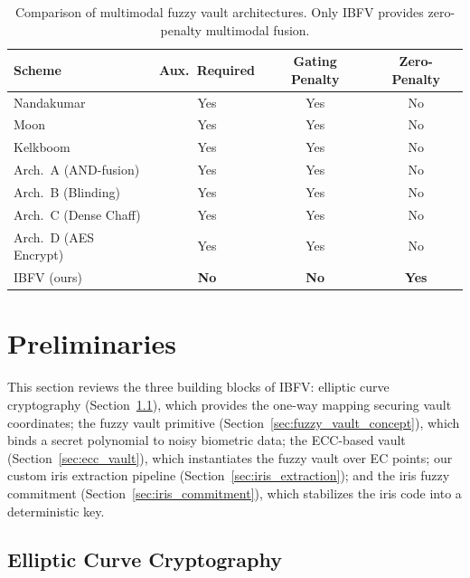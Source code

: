 \documentclass[conference]{IEEEtran}
\newcommand{\IBFV}{\textsf{IBFV}}
\begin{document}
\begin{table}[t]
\centering
\caption{Comparison of multimodal fuzzy vault architectures. Only \IBFV{} provides zero-penalty multimodal fusion.}
\label{tab:related_gap}
\begin{tabular}{@{}l c c c@{}}
\toprule
\textbf{Scheme} & \textbf{Aux.\ Required} & \textbf{Gating Penalty} & \textbf{Zero-Penalty} \\
\midrule
Nandakumar~\cite{nandakumar2008multibiometric} & Yes & Yes & No \\
Moon~\cite{moon2010multibiometric} & Yes & Yes & No \\
Kelkboom~\cite{kelkboom2011multialgorithm} & Yes & Yes & No \\
Arch.\ A (AND-fusion) & Yes & Yes & No \\
Arch.\ B (Blinding) & Yes & Yes & No \\
Arch.\ C (Dense Chaff) & Yes & Yes & No \\
Arch.\ D (AES Encrypt) & Yes & Yes & No \\
\midrule
\IBFV{} (ours) & \textbf{No} & \textbf{No} & \textbf{Yes} \\
\bottomrule
\end{tabular}
\end{table}

\section{Preliminaries}
\label{sec:preliminaries}

This section reviews the three building blocks of \IBFV{}: elliptic curve cryptography (Section~\ref{sec:ecc_background}), which provides the one-way mapping securing vault coordinates; the fuzzy vault primitive (Section~\ref{sec:fuzzy_vault_concept}), which binds a secret polynomial to noisy biometric data; the ECC-based vault (Section~\ref{sec:ecc_vault}), which instantiates the fuzzy vault over EC points; our custom iris extraction pipeline (Section~\ref{sec:iris_extraction}); and the iris fuzzy commitment (Section~\ref{sec:iris_commitment}), which stabilizes the iris code into a deterministic key.

\subsection{Elliptic Curve Cryptography}
\label{sec:ecc_background}
\end{document}
